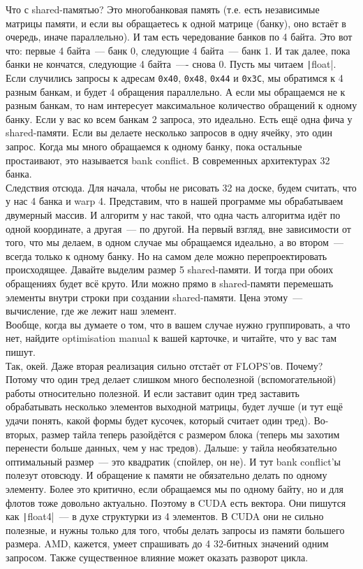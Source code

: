 \documentclass{article}
\begin{document}
    Что с shared-памятью? Это многобанковая память (т.е. есть независимые матрицы памяти, и если вы обращаетесь к одной матрице (банку), оно встаёт в очередь, иначе параллельно). И там есть чередование банков по 4 байта. Это вот что: первые 4 байта~--- банк 0, следующие 4 байта~--- банк 1. И так далее, пока банки не кончатся, следующие 4 байта~---- снова 0. Пусть мы читаем \texttt|float|. Если случились запросы к адресам \Verb|0x40|, \Verb|0x48|, \Verb|0x44| и \Verb|0x3С|, мы обратимся к 4 разным банкам, и будет 4 обращения параллельно. А если мы обращаемся не к разным банкам, то нам интересует максимальное количество обращений к одному банку. Если у вас ко всем банкам 2 запроса, это идеально. Есть ещё одна фича у shared-памяти. Если вы делаете несколько запросов в одну ячейку, это один запрос. Когда мы много обращаемся к одному банку, пока остальные простаивают, это называется bank conflict. В современных архитектурах 32 банка.\\
    Следствия отсюда. Для начала, чтобы не рисовать 32 на доске, будем считать, что у нас 4 банка и warp 4. Представим, что в нашей программе мы обрабатываем двумерный массив. И алгоритм у нас такой, что одна часть алгоритма идёт по одной координате, а другая~--- по другой. На первый взгляд, вне зависимости от того, что мы делаем, в одном случае мы обращаемся идеально, а во втором~--- всегда только к одному банку. Но на самом деле можно перепроектировать происходящее. Давайте выделим размер 5 shared-памяти. И тогда при обоих обращениях будет всё круто. Или можно прямо в shared-памяти перемешать элементы внутри строки при создании shared-памяти. Цена этому~--- вычисление, где же лежит наш элемент.\\
    Вообще, когда вы думаете о том, что в вашем случае нужно группировать, а что нет, найдите optimisation manual к вашей карточке, и читайте, что у вас там пишут.\\
    Так, окей. Даже вторая реализация сильно отстаёт от FLOPS'ов. Почему? Потому что один тред делает слишком много бесполезной (вспомогательной) работы относительно полезной. И если заставит один тред заставить обрабатывать несколько элементов выходной матрицы, будет лучше (и тут ещё удачи понять, какой формы будет кусочек, который считает один тред). Во-вторых, размер тайла теперь разойдётся с размером блока (теперь мы захотим перенести больше данных, чем у нас тредов). Дальше: у тайла необязательно оптимальный размер~--- это квадратик (спойлер, он не). И тут bank conflict'ы полезут отовсюду. И обращение к памяти не обязательно делать по одному элементу. Более это критично, если обращаемся мы по одному байту, но и для флотов тоже довольно актуально. Поэтому в CUDA есть вектора. Они пишутся как \texttt|float4|~--- в духе структурки из 4 элементов. В CUDA они не сильно полезные, и нужны только для того, чтобы делать запросы из памяти большего размера. AMD, кажется, умеет спрашивать до 4 32-битных значений одним запросом. Также существенное влияние может оказать разворот цикла.
\end{document}
